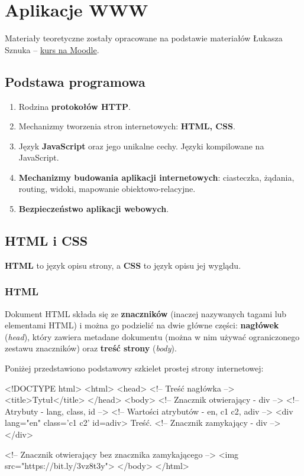 \chapter{Aplikacje WWW}

Materiały teoretyczne zostały opracowane na podstawie materiałów Łukasza Sznuka -- \href{https://moodle.mimuw.edu.pl/course/view.php?id=1375}{kurs na Moodle}.

\section*{Podstawa programowa}
\begin{enumerate}
    \item Rodzina \textbf{protokołów HTTP}.
    \item Mechanizmy tworzenia stron internetowych: \textbf{HTML, CSS}.
    \item Język \textbf{JavaScript} oraz jego unikalne cechy. Języki kompilowane na JavaScript.
    \item \textbf{Mechanizmy budowania aplikacji internetowych}: ciasteczka, żądania, routing, widoki, mapowanie obiektowo-relacyjne.
    \item \textbf{Bezpieczeństwo aplikacji webowych}.
\end{enumerate}

\section{HTML i CSS}

\textbf{HTML} to język opisu strony, a \textbf{CSS} to język opisu jej wyglądu.

\subsection{HTML}

Dokument HTML składa się ze \textbf{znaczników} (inaczej nazywanych tagami lub elementami HTML) i można go podzielić na dwie główne części: \textbf{nagłówek} (\textit{head}), który zawiera metadane dokumentu (można w nim używać ograniczonego zestawu znaczników) oraz \textbf{treść strony} (\textit{body}).

\begin{example}
    Poniżej przedstawiono podstawowy szkielet prostej strony internetowej:
    \begin{html}
        <!DOCTYPE html>
        <html>
            <head>
                <!-- Treść nagłówka -->
                <title>Tytuł</title>
            </head>
            <body>
                <!-- Znacznik otwierający - div -->
                <!-- Atrybuty - lang, class, id -->
                <!-- Wartości atrybutów - en, c1 c2, adiv -->
                <div lang="en" class='c1 c2' id=adiv>
                    Treść.
                <!-- Znacznik zamykający - div -->
                </div>
        
                <!-- Znacznik otwierający bez znacznika zamykającego -->
                <img src="https://bit.ly/3vz8t3y">
            </body>
        </html>
    \end{html}
\end{example}

